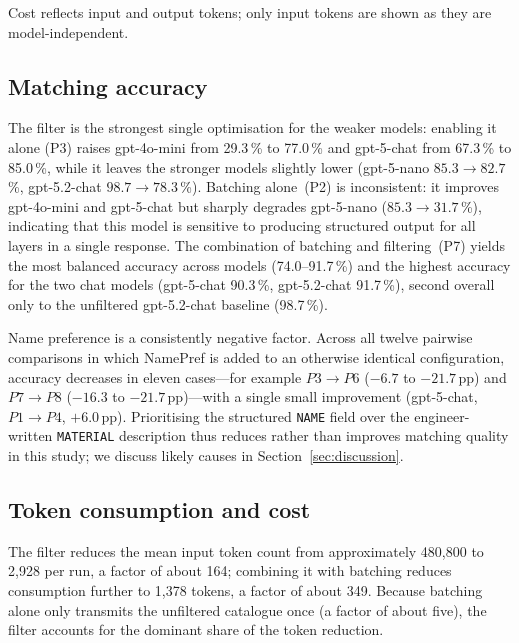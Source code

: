 \documentclass[10pt, a4paper, twocolumn]{article}
\begin{document}
Cost reflects input and output tokens; only input tokens are shown as they are model-independent.

\subsection{Matching accuracy}

The filter is the strongest single optimisation for the weaker models: enabling it alone
(P3) raises gpt-4o-mini from 29.3\,\% to 77.0\,\% and gpt-5-chat from 67.3\,\% to
85.0\,\%, while it leaves the stronger models slightly lower (gpt-5-nano
$85.3\rightarrow82.7$\,\%, gpt-5.2-chat $98.7\rightarrow78.3$\,\%). Batching alone~(P2)
is inconsistent: it improves gpt-4o-mini and gpt-5-chat but sharply degrades gpt-5-nano
($85.3\rightarrow31.7$\,\%), indicating that this model is sensitive to producing
structured output for all layers in a single response. The combination of batching and
filtering~(P7) yields the most balanced accuracy across models (74.0--91.7\,\%) and the
highest accuracy for the two chat models (gpt-5-chat 90.3\,\%, gpt-5.2-chat 91.7\,\%),
second overall only to the unfiltered gpt-5.2-chat baseline (98.7\,\%).

Name preference is a consistently negative factor. Across all twelve pairwise
comparisons in which NamePref is added to an otherwise identical configuration, accuracy
decreases in eleven cases---for example $P3\rightarrow P6$ ($-6.7$ to $-21.7$\,pp) and
$P7\rightarrow P8$ ($-16.3$ to $-21.7$\,pp)---with a single small improvement
(gpt-5-chat, $P1\rightarrow P4$, $+6.0$\,pp). Prioritising the structured \texttt{NAME}
field over the engineer-written \texttt{MATERIAL} description thus reduces rather than
improves matching quality in this study; we discuss likely causes in
Section~\ref{sec:discussion}. %

\subsection{Token consumption and cost}

The filter reduces the mean input token count from approximately 480{,}800 to 2{,}928
per run, a factor of about 164; combining it with batching reduces consumption further
to 1{,}378 tokens, a factor of about 349. Because batching alone only transmits the
unfiltered catalogue once (a factor of about five), the filter accounts for the dominant
share of the token reduction.
\end{document}
